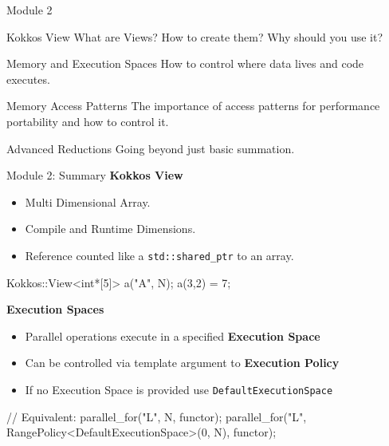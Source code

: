 \begin{frame}{Module 2}
  \begin{block}{Kokkos View}
    What are Views? How to create them? Why should you use it?
  \end{block}


  \begin{block}{Memory and Execution Spaces}
    How to control where data lives and code executes.
  \end{block}

  \begin{block}{Memory Access Patterns}
    The importance of access patterns for performance portability and how to control it.
  \end{block}

  \begin{block}{Advanced Reductions}
    Going beyond just basic summation.
  \end{block}
\end{frame}  









\begin{frame}[fragile]{Module 2: Summary}
	\textbf{Kokkos View}
	\begin{itemize}
		\item Multi Dimensional Array.
		\item Compile and Runtime Dimensions.
		\item Reference counted like a \texttt{std::shared\_ptr} to an array.
	\end{itemize}
\begin{code}[keywords={View,int}]
	Kokkos::View<int*[5]> a("A", N);
	a(3,2) = 7;
\end{code}

	\textbf{Execution Spaces}
	\begin{itemize}
		\item{Parallel operations execute in a specified \textbf{Execution Space}}
		\item{Can be controlled via template argument to \textbf{Execution Policy}}
		\item{If no Execution Space is provided use \texttt{DefaultExecutionSpace}}
	\end{itemize}
\begin{code}[keywords={parallel_for,Cuda,RangePolicy}]
// Equivalent:
parallel_for("L", N, functor);
parallel_for("L",
  RangePolicy<DefaultExecutionSpace>(0, N), functor);
\end{code}
\end{frame}

